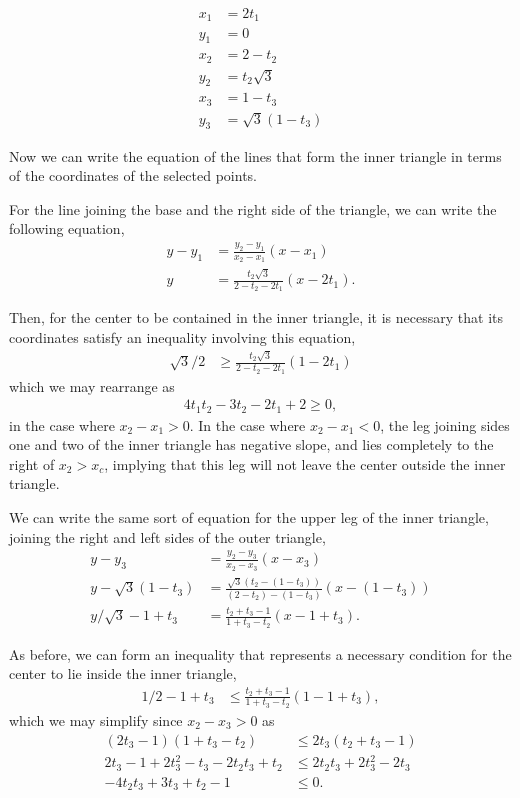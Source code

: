 \documentclass[reqno]{amsart}
\begin{document}
\begin{align*}
x_1 &= 2t_1 \\
y_1 &= 0 \\
x_2 &=  2 - t_2 \\
y_2 &= t_2 \sqrt{3} \\
x_3 &= 1-t_3 \\
y_3 &= \sqrt{3}(1-t_3)
\end{align*}

Now we can write the equation of the lines that form the inner triangle in terms of the coordinates of the selected points. 

For the line joining the base and the right side of the triangle, we can write the following equation,
\begin{align*}
y-y_1 &= \frac{y_2-y_1}{x_2-x_1} (x-x_1) \\
y &= \frac{t_2 \sqrt{3}}{2- t_2 - 2t_1} (x-2t_1).
\end{align*}

Then, for the center to be contained in the inner triangle, it is necessary that its coordinates satisfy an inequality involving this equation,
\begin{align*}
\sqrt{3}/2 &\geq \frac{t_2 \sqrt{3}}{2-t_2-2t_1} (1 - 2t_1)
\end{align*} 
which we may rearrange as 
\begin{align*}
4t_1 t_2 -3t_2-2t_1+2\geq 0,
\end{align*}
in the case where $x_2-x_1>0$. In the case where $x_2-x_1<0$, the leg joining sides one and two of the inner triangle has negative slope, and lies completely to the right of $x_2>x_c$, implying that this leg will not leave the center outside the inner triangle. 

We can write the same sort of equation for the upper leg of the inner triangle, joining the right and left sides of the outer triangle, 
\begin{align*}
y- y_3 &= \frac{y_2-y_3}{x_2-x_3}(x-x_3) \\
y- \sqrt{3}(1-t_3) &= \frac{\sqrt{3}(t_2 - (1-t_3))}{(2-t_2)-(1-t_3)}(x-(1-t_3)) \\
y/\sqrt{3}-1+t_3 & = \frac{t_2+t_3-1}{1+t_3-t_2}(x-1+t_3).
\end{align*}

As before, we can form an inequality that represents a necessary condition for the center to lie inside the inner triangle,
\begin{align*}
1/2-1+t_3 &\leq \frac{t_2+t_3-1}{1+t_3-t_2}(1-1+t_3),
\end{align*}
which we may simplify since $x_2-x_3>0$ as
\begin{align*}
(2t_3-1)(1+t_3-t_2) &\leq 2t_3(t_2+t_3-1) \\
2t_3-1+2t_3^2-t_3-2t_2 t_3+t_2 &\leq 2t_2 t_3 + 2t_3^2-2t_3 \\
-4t_2 t_3 + 3t_3+t_2-1&\leq 0.
\end{align*}
\end{document}
